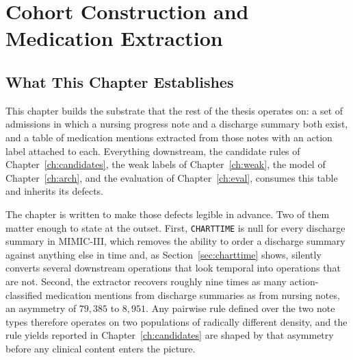 %
%

\chapter{Cohort Construction and Medication Extraction}
\label{ch:data}

\section{What This Chapter Establishes}
\label{sec:data-overview}

This chapter builds the substrate that the rest of the thesis operates on: a set
of admissions in which a nursing progress note and a discharge summary both
exist, and a table of medication mentions extracted from those notes with an
action label attached to each. Everything downstream, the candidate rules of
Chapter~\ref{ch:candidates}, the weak labels of Chapter~\ref{ch:weak}, the model
of Chapter~\ref{ch:arch}, and the evaluation of Chapter~\ref{ch:eval}, consumes
this table and inherits its defects.

The chapter is written to make those defects legible in advance. Two of them
matter enough to state at the outset. First, \texttt{CHARTTIME} is null for
every discharge summary in MIMIC-III, which removes the ability to order a
discharge summary against anything else in time and, as
Section~\ref{sec:charttime} shows, silently converts several downstream
operations that look temporal into operations that are not. Second, the
extractor recovers roughly nine times as many action-classified medication
mentions from discharge summaries as from nursing notes, an asymmetry of
$79{,}385$ to $8{,}951$. Any pairwise rule defined over the two note types
therefore operates on two populations of radically different density, and the
rule yields reported in Chapter~\ref{ch:candidates} are shaped by that asymmetry
before any clinical content enters the picture.

